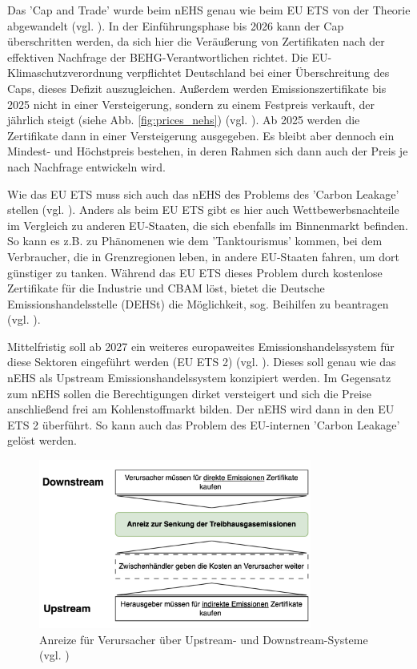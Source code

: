 Das 'Cap and Trade' wurde beim nEHS genau wie beim EU ETS von der Theorie abgewandelt (vgl. \cite{dehst.2023}).
In der Einführungsphase bis 2026 kann der Cap überschritten werden, da sich hier die Veräußerung von Zertifikaten nach der effektiven Nachfrage der BEHG-Verantwortlichen richtet.
Die EU-Klimaschutzverordnung verpflichtet Deutschland bei einer Überschreitung des Caps, dieses Defizit auszugleichen. 
Außerdem werden Emissionszertifikate bis 2025 nicht in einer Versteigerung, sondern zu einem Festpreis verkauft, der jährlich steigt (siehe Abb. \ref{fig:prices_nehs}) (vgl. \cite{dehst.2023}).
Ab 2025 werden die Zertifikate dann in einer Versteigerung ausgegeben.
Es bleibt aber dennoch ein Mindest- und Höchstpreis bestehen, in deren Rahmen sich dann auch der Preis je nach Nachfrage entwickeln wird.

Wie das EU ETS muss sich auch das nEHS des Problems des 'Carbon Leakage' stellen (vgl. \cite{dehst2.2023}). 
Anders als beim EU ETS gibt es hier auch Wettbewerbsnachteile im Vergleich zu anderen EU-Staaten, die sich ebenfalls im Binnenmarkt befinden.
So kann es z.B. zu Phänomenen wie dem 'Tanktourismus' kommen, bei dem Verbraucher, die in Grenzregionen leben, in andere EU-Staaten fahren, um dort günstiger zu tanken.
Während das EU ETS dieses Problem durch kostenlose Zertifikate für die Industrie und CBAM löst, bietet die Deutsche Emissionshandelsstelle (DEHSt) die Möglichkeit, sog. Beihilfen zu beantragen (vgl. \cite{dehst2.2023}).

Mittelfristig soll ab 2027 ein weiteres europaweites Emissionshandelssystem für diese Sektoren eingeführt werden (EU ETS 2) (vgl. \cite{ub.2023}).
Dieses soll genau wie das nEHS als Upstream Emissionshandelssystem konzipiert werden. Im Gegensatz zum nEHS sollen die Berechtigungen dirket versteigert und sich die Preise anschließend frei am Kohlenstoffmarkt bilden. 
Der nEHS wird dann in den EU ETS 2 überführt. So kann auch das Problem des EU-internen 'Carbon Leakage' gelöst werden.

\begin{figure}[ht]
	\centering
	\includegraphics[width=0.8\textwidth]{Bilder/up_and_downstream_ets.png} 
	\caption{Anreize für Verursacher über Upstream- und Downstream-Systeme (vgl. \cite{dehst.2023})}
	\label{fig:up_and_downstream_ets}
\end{figure}

